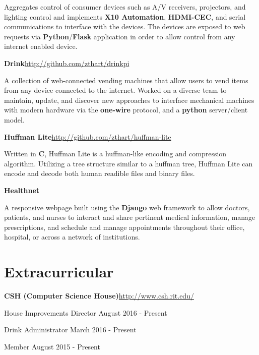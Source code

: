 \documentclass[margin,line]{resume}
\newcommand{\rurl}[1]{\hfill {\footnotesize \url{#1}}}
\begin{document}
\begin{resume}
\begin{asparablank}
		\small Aggregates control of consumer devices such as A/V receivers, projectors, and lighting control and implements \textbf{X10 Automation}, \textbf{HDMI-CEC}, and serial communications to interface with the devices. The devices are exposed to web requests via \textbf{Python}/\textbf{Flask} application in order to allow control from any internet enabled device.
		\normalsize
        \\
        \item {\bf Drink}\rurl{http://github.com/zthart/drinkpi}
        
        \small A collection of web-connected vending machines that allow users to vend items from any device connected to the internet. Worked on a diverse team to maintain, update, and discover new approaches to interface mechanical machines with modern hardware via the \textbf{one-wire} protocol, and a \textbf{python} server/client model.
        \normalsize
		\\
		\item {\bf Huffman Lite}\rurl{http://github.com/zthart/huffman-lite}
		
		\small Written in \textbf{C}, Huffman Lite is a huffman-like encoding and compression algorithm. Utilizing a tree structure similar to a huffman tree, Huffman Lite can encode and decode both human readible files and binary files.
		\normalsize
		\\
        \item {\bf Healthnet}\rurl{}
        
        \small A responsive webpage built using the \textbf{Django} web framework to allow doctors, patients, and nurses to interact and share pertinent medical information, manage prescriptions, and schedule and manage appointments throughout their office, hospital, or across a network of institutions.
          
	\end{asparablank}    
    
\section{\mysidestyle Extracurricular}
	\begin{asparablank}
		\item {\bf CSH ({\small Computer Science House})}\rurl{http://www.csh.rit.edu/}
		\small	\item House Improvements Director \hfill August 2016 - Present
        \small  \item Drink Administrator \hfill March 2016 - Present
        \small  \item Member \hfill August 2015 - Present
        \linebreak
        

\end{asparablank}
\end{resume}
\end{document}
